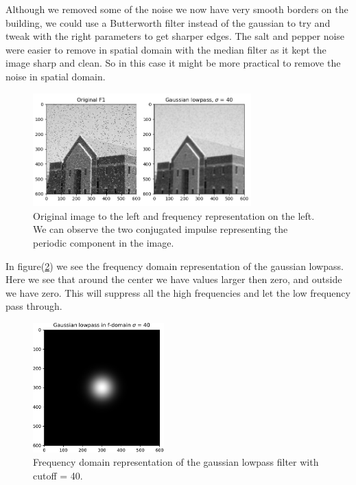 {    Although we removed some of the noise we now have very smooth borders on the building, we could use a Butterworth filter instead of the gaussian to try and tweak with the right parameters to get sharper edges. The salt and pepper noise were easier to remove in spatial domain with the median filter as it kept the image sharp and clean. So in this case it might be more practical to remove the noise in spatial domain.

    \begin{figure}[H]
        {\centering
            \includegraphics[width=0.75\textwidth]{task4pepper.png}
            \caption{Original image to the left and frequency representation on the left. We can observe the two conjugated impulse representing the periodic component in the image.}
            \label{task4pepper}
        \par}
        \end{figure}

In figure(\ref{gausf-dom}) we see the frequency domain representation of the gaussian lowpass. Here we see that around the center we have values larger then zero, and outside we have zero. This will suppress all the high frequencies and let the low frequency pass through.


\begin{figure}[H]
    {\centering
        \includegraphics[width=0.45\textwidth]{gausf-dom.pdf}
        \caption{Frequency domain representation of the gaussian lowpass filter with cutoff = 40.}
        \label{gausf-dom}
    \par}
    \end{figure}




}
